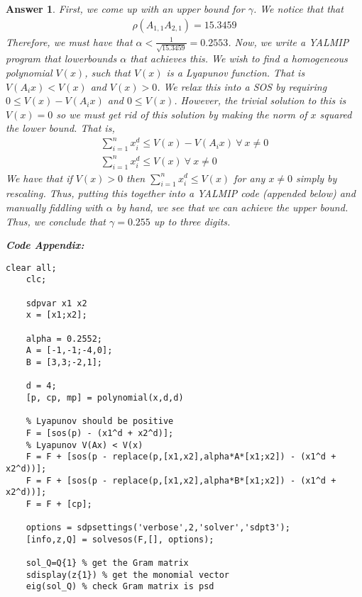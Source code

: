 \documentclass[12pt]{article}
\theoremstyle{colon}
\newtheorem*{answer}{Answer}
\begin{document}
\begin{answer}
  First, we come up with an upper bound for $\gamma$. We notice that that
  \begin{gather*}
    \rho(A_{1,1} A_{2,1}) = 15.3459
  \end{gather*}
  Therefore, we must have that $\alpha < \frac{1}{\sqrt{15.3459}} = 0.2553$. Now, we write a YALMIP program that lowerbounds $\alpha$ that achieves this. We wish to find a homogeneous polynomial $V(x)$, such that $V(x)$ is a Lyapunov function. That is $V(A_i x) < V(x)$ and $V(x) > 0$. We relax this into a SOS by requiring $0 \leq V(x) - V(A_i x)$ and $0 \leq V(x)$. However, the trivial solution to this is $V(x) = 0$ so we must get rid of this solution by making the norm of $x$ squared the lower bound. That is,
  \begin{gather*}
    \sum_{i=1}^n x_i^d \leq V(x) - V(A_i x) \ \forall \ x \neq 0 \\
    \sum_{i=1}^n x_i^d \leq V(x) \ \forall \ x \neq 0
  \end{gather*}
  We have that if $V(x) > 0$ then $\sum_{i=1}^n x_i^d \leq V(x)$ for any $x \neq 0$ simply by rescaling. Thus, putting this together into a YALMIP code (appended below) and manually fiddling with $\alpha$ by hand, we see that we can achieve the upper bound. Thus, we conclude that $\gamma = 0.255$ up to three digits.

  \clearpage

  \textbf{Code Appendix:}

  \begin{lstlisting}[style=Matlab-editor, basicstyle=\scriptsize]
    clear all;
    clc;

    sdpvar x1 x2
    x = [x1;x2];

    alpha = 0.2552;
    A = [-1,-1;-4,0];
    B = [3,3;-2,1];

    d = 4;
    [p, cp, mp] = polynomial(x,d,d)

    % Lyapunov should be positive
    F = [sos(p) - (x1^d + x2^d)];
    % Lyapunov V(Ax) < V(x)
    F = F + [sos(p - replace(p,[x1,x2],alpha*A*[x1;x2]) - (x1^d + x2^d))];
    F = F + [sos(p - replace(p,[x1,x2],alpha*B*[x1;x2]) - (x1^d + x2^d))];
    F = F + [cp];

    options = sdpsettings('verbose',2,'solver','sdpt3');
    [info,z,Q] = solvesos(F,[], options);

    sol_Q=Q{1} % get the Gram matrix
    sdisplay(z{1}) % get the monomial vector
    eig(sol_Q) % check Gram matrix is psd
  \end{lstlisting}
\end{answer}
\end{document}
